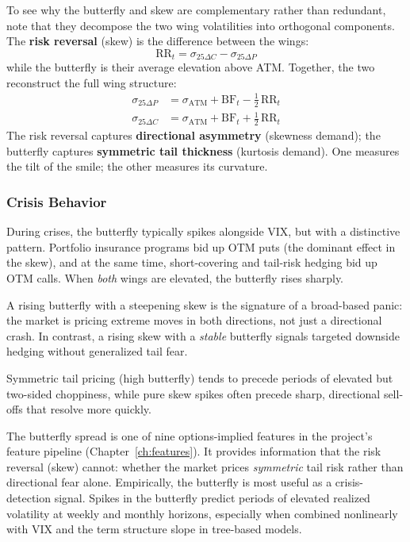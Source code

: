 To see why the butterfly and skew are complementary rather than redundant, note that they decompose the two wing volatilities into orthogonal components.
The \textbf{risk reversal} (skew) is the difference between the wings:
\[
  \mathrm{RR}_t = \sigma_{25\Delta C} - \sigma_{25\Delta P}
\]
while the butterfly is their average elevation above ATM.
Together, the two reconstruct the full wing structure:
\begin{align}
  \sigma_{25\Delta P} &= \sigma_{\mathrm{ATM}} + \mathrm{BF}_t - \tfrac{1}{2}\,\mathrm{RR}_t \label{eq:wing-put} \\
  \sigma_{25\Delta C} &= \sigma_{\mathrm{ATM}} + \mathrm{BF}_t + \tfrac{1}{2}\,\mathrm{RR}_t \label{eq:wing-call}
\end{align}
The risk reversal captures \textbf{directional asymmetry} (skewness demand); the butterfly captures \textbf{symmetric tail thickness} (kurtosis demand).
One measures the tilt of the smile; the other measures its curvature.

\subsubsection*{Crisis Behavior}

During crises, the butterfly typically spikes alongside VIX, but with a distinctive pattern.
Portfolio insurance programs bid up OTM puts (the dominant effect in the skew), and at the same time, short-covering and tail-risk hedging bid up OTM calls.
When \emph{both} wings are elevated, the butterfly rises sharply.

A rising butterfly with a steepening skew is the signature of a broad-based panic: the market is pricing extreme moves in both directions, not just a directional crash.
In contrast, a rising skew with a \emph{stable} butterfly signals targeted downside hedging without generalized tail fear.

Symmetric tail pricing (high butterfly) tends to precede periods of elevated but two-sided choppiness, while pure skew spikes often precede sharp, directional sell-offs that resolve more quickly.

\begin{projectconnection}
The butterfly spread is one of nine options-implied features in the project's feature pipeline (Chapter~\ref{ch:features}).
It provides information that the risk reversal (skew) cannot: whether the market prices \emph{symmetric} tail risk rather than directional fear alone.
Empirically, the butterfly is most useful as a crisis-detection signal.
Spikes in the butterfly predict periods of elevated realized volatility at weekly and monthly horizons, especially when combined nonlinearly with VIX and the term structure slope in tree-based models.
\end{projectconnection}

